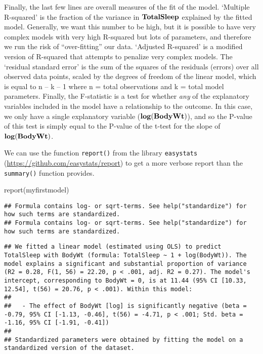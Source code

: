 \documentclass[
]{book}
\newenvironment{Shaded}{\begin{snugshade}}{\end{snugshade}}
\newcommand{\FunctionTok}[1]{\textcolor[rgb]{0.00,0.00,0.00}{#1}}
\newcommand{\NormalTok}[1]{#1}
\begin{document}
Finally, the last few lines are overall measures of the fit of the model. `Multiple R-squared' is the fraction of the variance in \(\bf{TotalSleep}\) explained by the fitted model. Generally, we want this number to be high, but it is possible to have very complex models with very high R-squared but lots of parameters, and therefore we run the risk of ``over-fitting'' our data. `Adjusted R-squared' is a modified version of R-squared that attempts to penalize very complex models. The `residual standard error' is the sum of the squares of the residuals (errors) over all observed data points, scaled by the degrees of freedom of the linear model, which is equal to n -- k -- 1 where n = total observations and k = total model parameters. Finally, the F-statistic is a test for whether \emph{any} of the explanatory variables included in the model have a relationship to the outcome. In this case, we only have a single explanatory variable (\(\bf{log(BodyWt)}\)), and so the P-value of this test is simply equal to the P-value of the t-test for the slope of \(\bf{log(BodyWt)}\).

We can use the function \texttt{report()} from the library \texttt{easystats} (\url{https://github.com/easystats/report}) to get a more verbose report than the \texttt{summary()} function provides.

\begin{Shaded}
\begin{Highlighting}[]
\FunctionTok{report}\NormalTok{(myfirstmodel)}
\end{Highlighting}
\end{Shaded}

\begin{verbatim}
## Formula contains log- or sqrt-terms. See help("standardize") for how such terms are standardized.
## Formula contains log- or sqrt-terms. See help("standardize") for how such terms are standardized.
\end{verbatim}

\begin{verbatim}
## We fitted a linear model (estimated using OLS) to predict TotalSleep with BodyWt (formula: TotalSleep ~ 1 + log(BodyWt)). The model explains a significant and substantial proportion of variance (R2 = 0.28, F(1, 56) = 22.20, p < .001, adj. R2 = 0.27). The model's intercept, corresponding to BodyWt = 0, is at 11.44 (95% CI [10.33, 12.54], t(56) = 20.76, p < .001). Within this model:
## 
##   - The effect of BodyWt [log] is significantly negative (beta = -0.79, 95% CI [-1.13, -0.46], t(56) = -4.71, p < .001; Std. beta = -1.16, 95% CI [-1.91, -0.41])
## 
## Standardized parameters were obtained by fitting the model on a standardized version of the dataset.
\end{verbatim}
\end{document}
